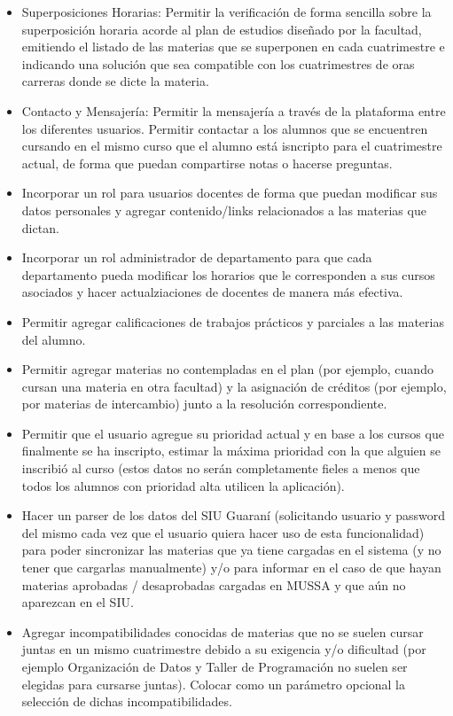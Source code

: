 \documentclass[a4paper]{article}
\begin{document}
\begin{itemize}
	\item Superposiciones Horarias: Permitir la verificación de forma sencilla sobre la superposición horaria acorde al plan de estudios diseñado por la facultad, emitiendo el listado de las materias que se superponen en cada cuatrimestre e indicando una solución que sea compatible con los cuatrimestres de oras carreras donde se dicte la materia.
	
	\item Contacto y Mensajería: Permitir la mensajería a través de la plataforma entre los diferentes usuarios. Permitir contactar a los alumnos que se encuentren cursando en el mismo curso que el alumno está isncripto para el cuatrimestre actual, de forma que puedan compartirse notas o hacerse preguntas.
	
	\item Incorporar un rol para usuarios docentes de forma que puedan modificar sus datos personales y agregar contenido/links relacionados a las materias que dictan.

	\item Incorporar un rol administrador de departamento para que cada departamento pueda modificar los horarios que le corresponden a sus cursos asociados y hacer actualziaciones de docentes de manera más efectiva.
	
	\item Permitir agregar calificaciones de trabajos prácticos y parciales a las materias del alumno.
	
	\item Permitir agregar materias no contempladas en el plan (por ejemplo, cuando cursan una materia en otra facultad) y la asignación de créditos (por ejemplo, por materias de intercambio) junto a la resolución correspondiente.
	
	\item Permitir que el usuario agregue su prioridad actual y en base a los cursos que finalmente se ha inscripto, estimar la máxima prioridad con la que alguien se inscribió al curso (estos datos no serán completamente fieles a menos que todos los alumnos con prioridad alta utilicen la aplicación).
	
	\item Hacer un parser de los datos del SIU Guaraní (solicitando usuario y password del mismo cada vez que el usuario quiera hacer uso de esta funcionalidad) para poder sincronizar las materias que ya tiene cargadas en el sistema (y no tener que cargarlas manualmente) y/o para informar en el caso de que hayan materias aprobadas / desaprobadas cargadas en MUSSA y que aún no aparezcan en el SIU.
	
	\item Agregar incompatibilidades conocidas de materias que no se suelen cursar juntas en un mismo cuatrimestre debido a su exigencia y/o dificultad (por ejemplo Organización de Datos y Taller de Programación no suelen ser elegidas para cursarse juntas). Colocar como un parámetro opcional la selección de dichas incompatibilidades.

\end{itemize}
\end{document}
